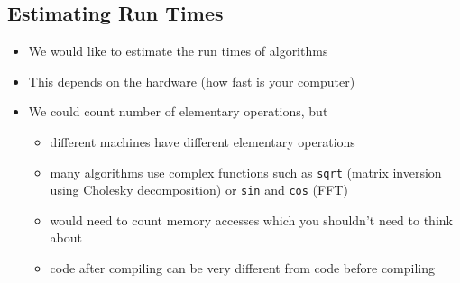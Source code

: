 \begin{slide}
\section{Estimating Run Times}

\vspace{-1cm}
\begin{PauseHighLight}
  \begin{itemize}
  \item We would like to estimate the run times of algorithms\pause
  \item This depends on the hardware (how fast is your computer)\pause
  \item We could count number of elementary operations\pause, but
    \begin{itemize}
    \item different machines have different elementary operations\pause
    \item many algorithms use complex functions such as \texttt{sqrt}
      (matrix inversion using Cholesky decomposition) or \texttt{sin} and
      \texttt{cos} (FFT)\pause
    \item would need to count memory accesses which you shouldn't need
      to think about\pause
    \item code after compiling can be very different from code before
      compiling \pause
    \end{itemize}
  \end{itemize}
\end{PauseHighLight}

\end{slide}


